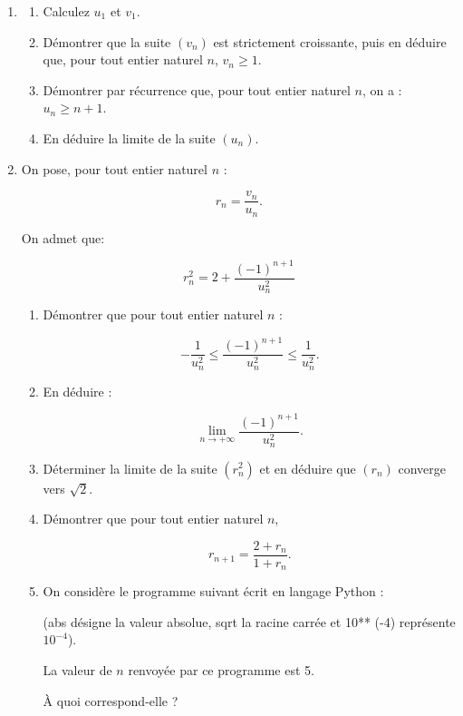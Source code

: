 \documentclass[10pt]{article}
\begin{document}
\begin{enumerate}
\item 
	\begin{enumerate}
		\item Calculez $u_1$ et $v_1$.
		\item Démontrer que la suite $\left(v_n\right)$ est strictement croissante, puis en déduire que, pour tout entier naturel $n$,\: $v_n \geqslant 1$.
		\item Démontrer par récurrence que, pour tout entier naturel $n$, on a : $u_n \geqslant  n + 1$.
		\item En déduire la limite de la suite $\left(u_n\right)$.
	\end{enumerate}
\item On pose, pour tout entier naturel $n$ :

\[r_n = \dfrac{v_n}{u_n}.\]

On admet que:

\[r_n^2 = 2 + \dfrac{(- 1)^{n+1}}{u_n^2}\]

	\begin{enumerate}
		\item Démontrer que pour tout entier naturel $n$ :

\[- \dfrac{1}{u_n^2} \leqslant \dfrac{(- 1)^{n+1}}{u_n^2} \leqslant \dfrac{1}{u_n^2}.\]
		\item En déduire :

\[\displaystyle\lim_{n \to + \infty} \dfrac{(- 1)^{n+1}}{u_n^2}.\]

		\item Déterminer la limite de la suite $\left(r_n^2\right)$ et en déduire que $\left(r_n\right)$ converge vers $\sqrt{2}$.
		\item  Démontrer que pour tout entier naturel $n$,

\[r_{n+1} = \dfrac{2 + r_n}{1 + r_n}.\]

		\item On considère le programme suivant écrit en langage Python :
		
\begin{center}
\end{center}

\smallskip

(abs désigne la valeur absolue, sqrt la racine carrée et 10** (-4) représente $10^{-4}$).

La valeur de $n$ renvoyée par ce programme est 5.

 À quoi correspond-elle ?
	\end{enumerate}
\end{enumerate}

\bigskip
\end{document}
